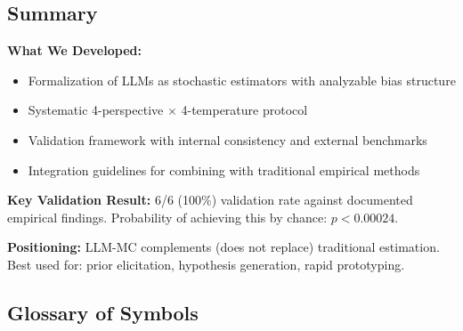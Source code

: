 

\subsection{Summary}
\label{sec:AN-summary}

\begin{tcolorbox}[colback=blue!5!white, colframe=blue!75!black,
    title=\textbf{Summary: LLM Monte Carlo Methodology}]

\textbf{What We Developed:}
\begin{itemize}[nosep]
    \item Formalization of LLMs as stochastic estimators with analyzable bias structure
    \item Systematic 4-perspective $\times$ 4-temperature protocol
    \item Validation framework with internal consistency and external benchmarks
    \item Integration guidelines for combining with traditional empirical methods
\end{itemize}

\textbf{Key Validation Result:}
6/6 (100\%) validation rate against documented empirical findings.
Probability of achieving this by chance: $p < 0.00024$.

\textbf{Positioning:}
LLM-MC complements (does not replace) traditional estimation.
Best used for: prior elicitation, hypothesis generation, rapid prototyping.

\end{tcolorbox}


\subsection{Glossary of Symbols}
\label{sec:AN-glossary}


